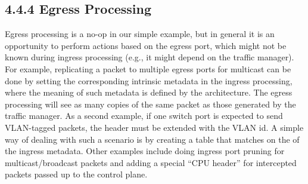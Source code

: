 \documentclass[letterpaper,11pt,english]{sphinxmanual}
\begin{document}
\subsection{4.4.4 Egress Processing}
\label{\detokenize{switch:egress-processing}}
Egress processing is a no-op in our simple example, but in general it
is an opportunity to perform actions based on the egress port, which
might not be known during ingress processing (e.g., it might depend on
the traffic manager). For example, replicating a packet to multiple
egress ports for multicast can be done by setting the corresponding
intrinsic metadata in the ingress processing, where the meaning of
such metadata is defined by the architecture. The egress processing
will see as many copies of the same packet as those generated by the
traffic manager. As a second example, if one switch port is expected
to send VLAN-tagged packets, the header must be extended with the
VLAN id. A simple way of dealing with such a scenario is by creating a
table that matches on the  of the ingress
metadata. Other examples include doing ingress port pruning for
multicast/broadcast packets and adding a special “CPU header” for
intercepted packets passed up to the control plane.
\end{document}
